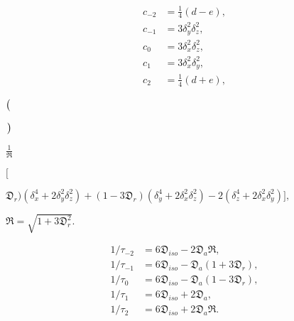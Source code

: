 \documentclass[a4paper,11pt,twoside,openright]{book}
\def\lthtmlcheckvsize{\ifdim\ht\sizebox<\vsize 
  \ifdim\wd\sizebox<\hsize\expandafter\hfill\fi \expandafter\vfill
  \else\expandafter\vss\fi}%
\begin{document}
{\newpage\clearpage
\setcounter{equation}{10}
%
\begin{subequations}\begin{align}
c_{-2} &= \tfrac{1}{4}(d - e),\\
c_{-1} &= 3\delta_y^2\delta_z^2,\\
c_{0}  &= 3\delta_x^2\delta_z^2,\\
c_{1}  &= 3\delta_x^2\delta_y^2,\\
c_{2}  &= \tfrac{1}{4}(d + e),\end{align}\end{subequations}%
\lthtmldisplayZ
\lthtmlcheckvsize\clearpage}

{\newpage\clearpage
{}%
$\displaystyle \left(\vphantom{ \delta_x^4 + \delta_y^4 + \delta_z^4 }\right.$%
\lthtmlindisplaymathZ
\lthtmlcheckvsize\clearpage}

{\newpage\clearpage
{}%
$\displaystyle \left.\vphantom{ \delta_x^4 + \delta_y^4 + \delta_z^4 }\right)$%
\lthtmlindisplaymathZ
\lthtmlcheckvsize\clearpage}

{\newpage\clearpage
{}%
$\displaystyle {\frac{{1}}{{\mathfrak{R}}}}$%
\lthtmlindisplaymathZ
\lthtmlcheckvsize\clearpage}

{\newpage\clearpage
{}%
$\displaystyle \bigg[$%
\lthtmlindisplaymathZ
\lthtmlcheckvsize\clearpage}

{\newpage\clearpage
{}%
$\displaystyle \mathfrak{D}_r) \left(\delta_x^4 + 2\delta_y^2\delta_z^2\right)
+ (1 - 3\mathfrak{D}_r) \left(\delta_y^4 + 2\delta_x^2\delta_z^2\right) - 2 \left(\delta_z^4 + 2\delta_x^2\delta_y^2\right) \bigg],$%
\lthtmlindisplaymathZ
\lthtmlcheckvsize\clearpage}

{\newpage\clearpage
{}%
$\displaystyle \mathfrak{R} = \sqrt{1 + 3\mathfrak{D}_r^2}.$%
\lthtmlindisplaymathZ
\lthtmlcheckvsize\clearpage}

{\newpage\clearpage
\setcounter{equation}{14}
%
\begin{subequations}\begin{align}
1/\tau_{-2} &= 6 \mathfrak{D}_{iso} - 2\mathfrak{D}_a\mathfrak{R},\\
1/\tau_{-1} &= 6 \mathfrak{D}_{iso} - \mathfrak{D}_a (1 + 3\mathfrak{D}_r),\\
1/\tau_{0}  &= 6 \mathfrak{D}_{iso} - \mathfrak{D}_a (1 - 3\mathfrak{D}_r),\\
1/\tau_{1}  &= 6 \mathfrak{D}_{iso} + 2\mathfrak{D}_a,\\
1/\tau_{2}  &= 6 \mathfrak{D}_{iso} + 2\mathfrak{D}_a\mathfrak{R}.\end{align}\end{subequations}%
\lthtmldisplayZ
\lthtmlcheckvsize\clearpage}
\end{document}
